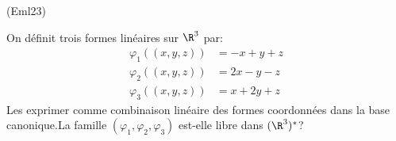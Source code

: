 \begin{tiny}(Eml23)\end{tiny} On définit trois formes linéaires sur $\R^3$ par:
\begin{align*}
  \varphi_1((x,y,z)) &= -x+y+z \\
  \varphi_2((x,y,z)) &= 2x-y-z \\
  \varphi_3((x,y,z)) &= x+2y+z
\end{align*}
Les exprimer comme combinaison linéaire des formes coordonnées dans la base canonique.\newline La famille $(\varphi_1, \varphi_2, \varphi_3)$ est-elle libre dans $(\R^3)^*$?
